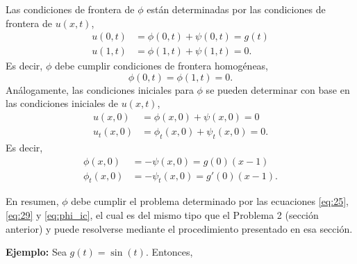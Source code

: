 \documentclass[11pt]{article}
\begin{document}
Las condiciones de frontera de $\phi$ est\'an determinadas por las condiciones de frontera de $u(x,t)$,
\begin{align}
  \label{eq:27}
  u(0,t) &= \phi(0,t) + \psi(0,t) = g(t) \\
  u(1,t) &= \phi(1,t) + \psi(1,t) = 0.
\end{align}
Es decir, $\phi$ debe cumplir condiciones de frontera homog\'eneas,
\begin{equation}
  \label{eq:29}
  \phi(0,t) = \phi(1,t) = 0.
\end{equation}
An\'alogamente, las condiciones iniciales para $\phi$ se pueden determinar con base en las condiciones iniciales de $u(x,t)$,
\begin{align}
  \label{eq:30}
  u(x,0) &= \phi(x,0) + \psi(x,0) = 0 \\
  u_t(x,0) &= \phi_t(x,0) + \psi_t(x,0) = 0.
\end{align}
Es decir,
\begin{subequations}
\label{eq:phi_ic}
\begin{align}
  \phi(x,0) &= -\psi(x,0) = g(0)(x-1) \\
  \phi_t(x,0) &= -\psi_t(x,0) = g'(0)(x-1).
\end{align}  
\end{subequations}

En resumen, $\phi$ debe cumplir el problema determinado por las ecuaciones \eqref{eq:25}, \eqref{eq:29} y \eqref{eq:phi_ic}, el cual es del mismo tipo que el Problema 2 (secci\'on anterior) y puede resolverse mediante el procedimiento presentado en esa secci\'on.

{\bf Ejemplo:} Sea $g(t) = \sin(t)$. Entonces,
\end{document}
